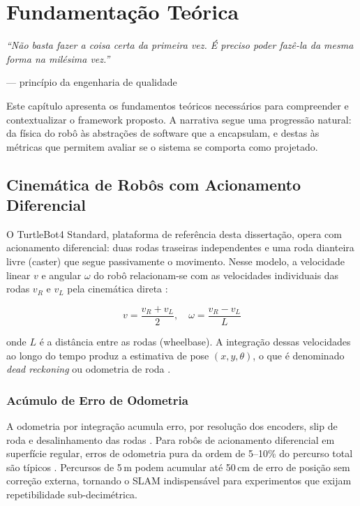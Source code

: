 \chapter{Fundamentação Teórica}
\label{chap:fundamentacao}

\epigraph{\itshape ``Não basta fazer a coisa certa da primeira vez. É preciso poder
fazê-la da mesma forma na milésima vez.''}{\normalfont --- princípio da engenharia de qualidade}

Este capítulo apresenta os fundamentos teóricos necessários para compreender e
contextualizar o framework proposto. A narrativa segue uma progressão natural: da
física do robô às abstrações de software que a encapsulam, e destas às métricas
que permitem avaliar se o sistema se comporta como projetado.

\section{Cinemática de Robôs com Acionamento Diferencial}
\label{sec:cinematica}

O TurtleBot4 Standard, plataforma de referência desta dissertação, opera com acionamento
diferencial: duas rodas traseiras independentes e uma roda dianteira livre (caster)
que segue passivamente o movimento. Nesse modelo, a velocidade linear $v$ e angular
$\omega$ do robô relacionam-se com as velocidades individuais das rodas $v_R$ e $v_L$
pela cinemática direta \cite{siegwart2011}:

\begin{equation}
v = \frac{v_R + v_L}{2}, \quad \omega = \frac{v_R - v_L}{L}
\label{eq:cinematica_diferencial}
\end{equation}

\noindent onde $L$ é a distância entre as rodas (wheelbase). A integração dessas
velocidades ao longo do tempo produz a estimativa de pose $(x, y, \theta)$, o
que é denominado \textit{dead reckoning} ou odometria de roda \cite{siegwart2011}.

\subsection{Acúmulo de Erro de Odometria}
\label{sec:erro_odometria}

A odometria por integração acumula erro, por resolução dos encoders, slip de
roda e desalinhamento das rodas \cite{thrun2005, siegwart2011, borenstein1996}. Para robôs de
acionamento diferencial em superfície regular, erros de odometria pura
da ordem de 5--10\% do percurso total são típicos \cite{siegwart2011}. Percursos de
5\,m podem acumular até 50\,cm de erro de posição sem correção externa, tornando o SLAM
indispensável para experimentos que exijam repetibilidade sub-decimétrica.

